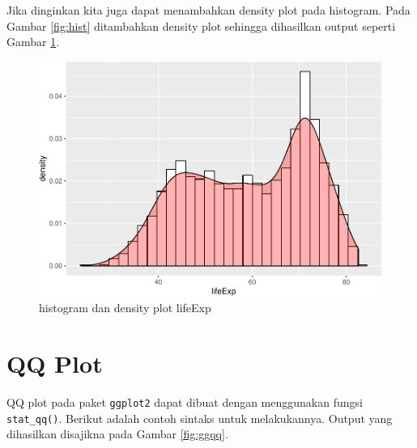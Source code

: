\documentclass[]{book}
\newenvironment{Shaded}{\begin{snugshade}}{\end{snugshade}}
\newcommand{\KeywordTok}[1]{\textcolor[rgb]{0.13,0.29,0.53}{\textbf{#1}}}
\newcommand{\DataTypeTok}[1]{\textcolor[rgb]{0.13,0.29,0.53}{#1}}
\newcommand{\FloatTok}[1]{\textcolor[rgb]{0.00,0.00,0.81}{#1}}
\newcommand{\StringTok}[1]{\textcolor[rgb]{0.31,0.60,0.02}{#1}}
\newcommand{\CommentTok}[1]{\textcolor[rgb]{0.56,0.35,0.01}{\textit{#1}}}
\newcommand{\OperatorTok}[1]{\textcolor[rgb]{0.81,0.36,0.00}{\textbf{#1}}}
\newcommand{\NormalTok}[1]{#1}
\begin{document}
Jika dinginkan kita juga dapat menambahkan density plot pada histogram.
Pada Gambar \ref{fig:hist} ditambahkan density plot sehingga dihasilkan
output seperti Gambar \ref{fig:ggdenshist}.

\begin{Shaded}
\end{Shaded}

\begin{figure}

{\centering \includegraphics[width=0.7\linewidth]{EnvStat_files/figure-latex/ggdenshist-1} 

}

\caption{histogram dan density plot lifeExp }\label{fig:ggdenshist}
\end{figure}

\section{QQ Plot}\label{qq-plot-1}

QQ plot pada paket \texttt{ggplot2} dapat dibuat dengan menggunakan
fungsi \texttt{stat\_qq()}. Berikut adalah contoh sintaks untuk
melakukannya. Output yang dihasilkan disajikna pada Gambar
\ref{fig:ggqq}.
\end{document}
